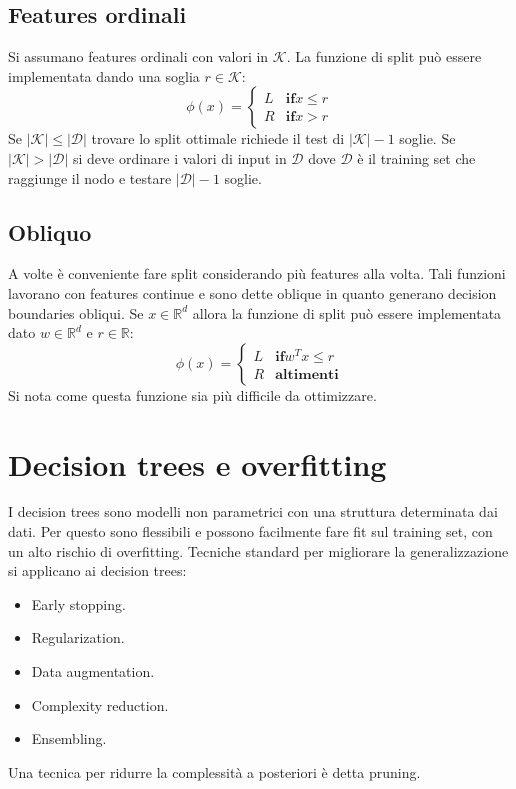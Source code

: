 	\subsection{Features ordinali}
	Si assumano features ordinali con valori in $\mathcal{K}$.
	La funzione di split pu\`o essere implementata dando una soglia $r\in\mathcal{K}$:
	$$\phi(x) = \begin{cases}L &\mathbf{if} x\le r\\
		 								  R &\mathbf{if} x>r
				 \end{cases}$$
	Se $|\mathcal{K}|\le|\mathcal{D}|$ trovare lo split ottimale richiede il test di $|\mathcal{K}|-1$ soglie.
	Se $|\mathcal{K}|>|\mathcal{D}|$ si deve ordinare i valori di input in $\mathcal{D}$ dove $\mathcal{D}$ \`e il training set che raggiunge il nodo e testare $|\mathcal{D}|-1$ soglie.

	\subsection{Obliquo}
	A volte \`e conveniente fare split considerando pi\`u features alla volta.
	Tali funzioni lavorano con features continue e sono dette oblique in quanto generano decision boundaries obliqui.
	Se $x\in\mathbb{R}^d$ allora la funzione di split pu\`o essere implementata dato $w\in\mathbb{R}^d$ e $r\in\mathbb{R}$:
	$$\phi(x) = \begin{cases}L &\mathbf{if} w^Tx\le r\\
		 								  R &\mathbf{altimenti}
			 	\end{cases}$$
	Si nota come questa funzione sia pi\`u difficile da ottimizzare.

\section{Decision trees e overfitting}
I decision trees sono modelli non parametrici con una struttura determinata dai dati.
Per questo sono flessibili e possono facilmente fare fit sul training set, con un alto rischio di overfitting.
Tecniche standard per migliorare la generalizzazione si applicano ai decision trees:
\begin{multicols}{2}
	\begin{itemize}
		\item Early stopping.
		\item Regularization.
		\item Data augmentation.
		\item Complexity reduction.
		\item Ensembling.
	\end{itemize}
\end{multicols}
Una tecnica per ridurre la complessit\`a a posteriori \`e detta pruning.

